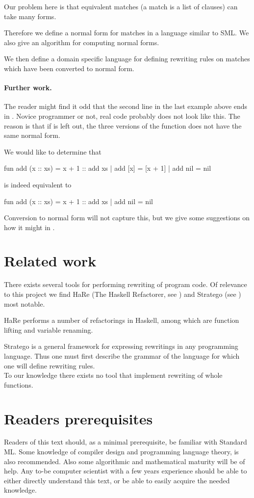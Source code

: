 Our problem here is that equivalent matches (a match is a list of clauses) can
take many forms.

Therefore we define a normal form for matches in a language similar to SML. We
also give an algorithm for computing normal forms.

We then define a domain specific language for defining rewriting rules on
matches which have been converted to normal form.

\paragraph{Further work.}
The reader might find it odd that the second line in the last example above ends
in . Novice programmer or not, real code probably does not
look like this. The reason is that if  is left out, the three
versions of the function  does not have the same normal form.

We would like to determine that
\begin{sml}
fun add (x :: xs) = x + 1 :: add xs
  | add [x]       = [x + 1]
  | add nil       = nil
\end{sml}
is indeed equivalent to
\begin{sml}
fun add (x :: xs) = x + 1 :: add xs
  | add nil       = nil
\end{sml}
Conversion to normal form will not capture this, but we give some suggestions on
how it might in .

\section{Related work}
There exists several tools for performing rewriting of program code. Of
relevance to this project we find HaRe (The Haskell Refactorer, see \cite{HARE})
and Stratego (see \cite{stratego}) most notable.

HaRe performs a number of refactorings in Haskell, among which are function
lifting and variable renaming.

Stratego is a general framework for expressing rewritings in any programming
language. Thus one must first describe the grammar of the language for which one
will define rewriting rules.\\

To our knowledge there exists no tool that implement rewriting of whole
functions.

\section{Readers prerequisites}
Readers of this text should, as a minimal prerequisite, be familiar with
Standard ML. Some knowledge of compiler design and programming language theory,
is also recommended. Also some algorithmic and mathematical maturity will be
of help. Any to-be computer scientist with a few years experience should be able
to either directly understand this text, or be able to easily acquire the needed
knowledge.\\


